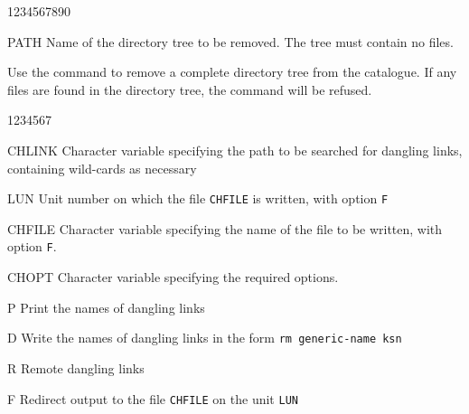 \begin{DLtt}{1234567890}
\item[PATH]Name of the directory tree to be removed. The tree must
contain no files.
\end{DLtt}
Use the  command to remove a complete directory tree from the catalogue.
If any files are found in the directory tree, the command will be refused.

\begin{DLtt}{1234567}
\item[CHLINK]Character variable specifying the path to be searched
for dangling links, containing wild-cards as necessary
\item[LUN]Unit number on which the file {\tt CHFILE} is written,
with option {\tt F}
\item[CHFILE]
Character variable specifying the name of the file to be written,
with option {\tt F}.
\item[CHOPT]
Character variable specifying the required options.
\begin{DLtt}{12}
\item[P]Print the names of dangling links
\item[D]Write the names of dangling links in the form {\tt rm generic-name ksn}
\item[R]Remote dangling links
\item[F]Redirect output to the file {\tt CHFILE} on the unit {\tt LUN}
\end{DLtt}
\end{DLtt}
